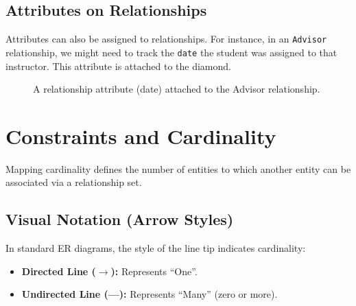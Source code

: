 \documentclass[12pt,a4paper]{article}
\begin{document}
\subsection{Attributes on Relationships}
Attributes can also be assigned to relationships. For instance, in an \texttt{Advisor} relationship, we might need to track the \texttt{date} the student was assigned to that instructor. This attribute is attached to the diamond.

\begin{figure}[H]
    \centering
    \caption{A relationship attribute (date) attached to the Advisor relationship.}
\end{figure}

\newpage
\section{Constraints and Cardinality}

Mapping cardinality defines the number of entities to which another entity can be associated via a relationship set.

\subsection{Visual Notation (Arrow Styles)}
In standard ER diagrams, the style of the line tip indicates cardinality:
\begin{itemize}
    \item \textbf{Directed Line ($\rightarrow$):} Represents ``One''.
    \item \textbf{Undirected Line (—):} Represents ``Many'' (zero or more).
\end{itemize}
\end{document}
